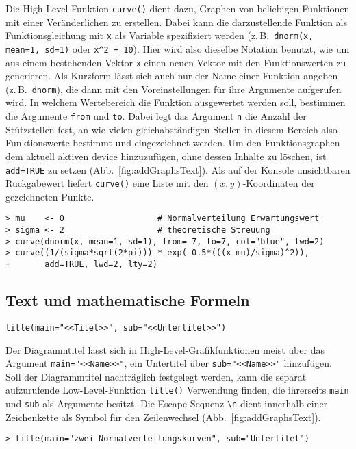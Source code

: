 Die High-Level-Funktion \lstinline!curve()! dient dazu, Graphen von beliebigen Funktionen mit einer Veränderlichen zu erstellen. Dabei kann die darzustellende Funktion als Funktionsgleichung mit \lstinline!x! als Variable spezifiziert werden (z.\,B.\ \lstinline!dnorm(x, mean=1, sd=1)! oder \lstinline!x^2 + 10!). Hier wird also dieselbe Notation benutzt, wie um aus einem bestehenden Vektor \lstinline!x! einen neuen Vektor mit den Funktionswerten zu generieren. Als Kurzform lässt sich auch nur der Name einer Funktion angeben (z.\,B.\ \lstinline!dnorm!), die dann mit den Voreinstellungen für ihre Argumente aufgerufen wird. In welchem Wertebereich die Funktion ausgewertet werden soll, bestimmen die Argumente \lstinline!from! und \lstinline!to!. Dabei legt das Argument \lstinline!n! die Anzahl der Stützstellen fest, an wie vielen gleichabständigen Stellen in diesem Bereich also Funktionswerte bestimmt und eingezeichnet werden. Um den Funktionsgraphen dem aktuell aktiven device hinzuzufügen, ohne dessen Inhalte zu löschen, ist \lstinline!add=TRUE! zu setzen (Abb.\ \ref{fig:addGraphsText}). Als auf der Konsole unsichtbaren Rückgabewert liefert \lstinline!curve()! eine Liste mit den $(x, y)$-Koordinaten der gezeichneten Punkte.
\begin{lstlisting}
> mu    <- 0                   # Normalverteilung Erwartungswert
> sigma <- 2                   # theoretische Streuung
> curve(dnorm(x, mean=1, sd=1), from=-7, to=7, col="blue", lwd=2)
> curve((1/(sigma*sqrt(2*pi))) * exp(-0.5*(((x-mu)/sigma)^2)),
+       add=TRUE, lwd=2, lty=2)
\end{lstlisting}

\subsection{Text und mathematische Formeln}

\begin{lstlisting}
title(main="<<Titel>>", sub="<<Untertitel>>")
\end{lstlisting}

Der Diagrammtitel lässt sich in High-Level-Grafikfunktionen meist über das Argument \lstinline!main="<<Name>>"!, ein Untertitel über \lstinline!sub="<<Name>>"! hinzufügen. Soll der Diagrammtitel nachträglich festgelegt werden, kann die separat aufzurufende Low-Level-Funktion \lstinline!title()! Verwendung finden, die ihrerseits \lstinline!main! und \lstinline!sub! als Argumente besitzt. Die Escape-Sequenz \lstinline!\n! dient innerhalb einer Zeichenkette als Symbol für den Zeilenwechsel (Abb.\ \ref{fig:addGraphsText}).
\begin{lstlisting}
> title(main="zwei Normalverteilungskurven", sub="Untertitel")
\end{lstlisting}

